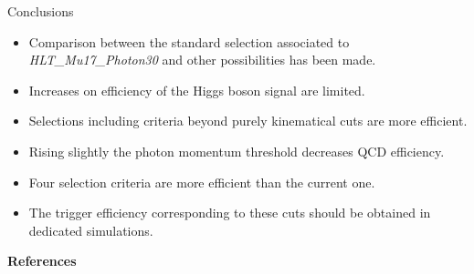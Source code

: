 \documentclass[aspectratio = 1610, xcolor = dvipsnames]{beamer}
\newcommand{\red}{\textcolor{unipd}}
\begin{document}
    \begin{frame}[t]{Conclusions}
		\vspace{20pt}
        \begin{itemize}
            \item \red{Comparison} between the standard selection associated to {\it HLT\_Mu17\_Photon30} and other possibilities has been made.\vspace{5pt}
            \item Increases on efficiency of the Higgs boson signal are \red{limited}.\vspace{5pt}
            \item Selections including \red{criteria beyond purely kinematical} cuts are \red{more efficient}.
            \item Rising slightly the \red{photon momentum threshold} decreases QCD efficiency.\vspace{5pt}
            \item Four selection criteria are \red{more efficient} than the current one.\vspace{5pt}
            \item The \red{trigger efficiency} corresponding to these cuts should be obtained in \red{dedicated simulations}.
        \end{itemize}

    \end{frame}

    
	\begin{frame}{\bf References}
		\footnotesize{\printbibliography}
	\end{frame}
	
	
\end{document}
